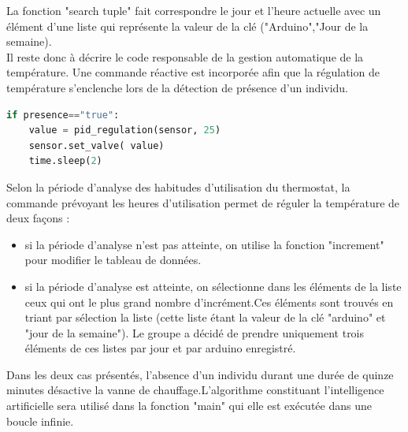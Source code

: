 \documentclass[12pt]{report}
\begin{document}
\noindent
La fonction "search tuple" fait correspondre le jour et l'heure actuelle avec un élément d'une liste qui représente la valeur de la clé ("Arduino","Jour de la semaine).\\ 

\noindent
Il reste donc à décrire le code responsable de la gestion automatique de la température. Une commande réactive est incorporée afin que la régulation de température s'enclenche lors de la détection de présence d'un individu.
\begin{lstlisting}[language=python]
if presence=="true":
	value = pid_regulation(sensor, 25)
    sensor.set_valve( value)
    time.sleep(2)
\end{lstlisting}
Selon la période d'analyse des habitudes d'utilisation du thermostat, la commande prévoyant les heures d'utilisation permet de réguler la température de deux façons :
\begin{itemize}
\item si la période d'analyse n'est pas atteinte, on utilise la fonction "increment" pour modifier le tableau de données. 
\item si la période d'analyse est atteinte, on sélectionne dans les éléments de la liste ceux qui ont le plus grand nombre d'incrément.Ces éléments sont trouvés en triant par sélection la liste (cette liste étant la valeur de la clé "arduino" et "jour de la semaine"). Le groupe a décidé de prendre uniquement trois éléments de ces listes par jour et par arduino enregistré. 
\end{itemize}
Dans les deux cas présentés, l'absence d'un individu durant une durée de quinze minutes désactive la vanne de chauffage.L'algorithme constituant l'intelligence artificielle sera utilisé dans la fonction "main" qui elle  est exécutée dans une boucle infinie.\\
\end{document}

